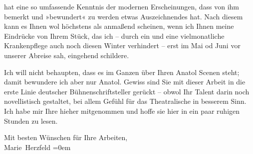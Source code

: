                hat eine so umfassende Kenntnis der modernen Erscheinungen, dass von ihm be{\pb}merkt und »bewundert« zu werden etwas Auszeichnendes hat.
               Nach diesem kann es Ihnen wol höchstens als anmaßend scheinen, wenn ich Ihnen meine
               Eindrücke von Ihrem Stück, das
               ich – durch ein \label{K_L02590-3v}\label{K_L02590-3} und eine vielmonatliche
               Krankenpflege auch noch diesen Winter verhindert – erst im Mai{ }\introOben{}od Juni\introOben{} vor unserer Abreise sah, eingehend schildere.\pend
           
\pstart
           Ich will nicht behaupten, dass es im Ganzen über Ihren Anatol Scenen steht; damit bewundere ich aber nur Anatol. Gewiss sind Sie mit dieser Arbeit in {\pb}die erste Linie deutscher Bühnenschriftsteller gerückt –
               obwol Ihr Talent darin noch novellistisch 
               gestaltet, bei allem Gefühl für das Theatralische in besserem Sinn. Ich habe mir Ihre
                  \label{K_L02590-4v}\label{K_L02590-4}{ }hieher mitgenommen und hoffe
               sie hier in ein paar ruhigen
               Stunden zu lesen.\pend
           
\pstart
           Mit besten Wünschen für Ihre Arbeiten, {\\[\baselineskip]}\spacefill\mbox{Marie Herzfeld}\pend
           \leftskip=0em{}\endnumbering{}  
      